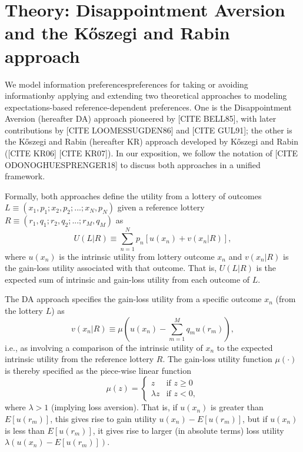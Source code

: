 \documentclass[12pt]{article}
\begin{document}
\section{Theory: Disappointment Aversion and the Kőszegi and Rabin approach}

We model information preferences\textemdash preferences for taking or avoiding information\textemdash by applying and extending two theoretical approaches to modeling expectations-based reference-dependent preferences. One is the Disappointment Aversion (hereafter DA) approach pioneered by [CITE BELL85], with later contributions by [CITE LOOMESSUGDEN86] and [CITE GUL91]; the other is the Kőszegi and Rabin (hereafter KR) approach developed by Kőszegi and Rabin ([CITE KR06] [CITE KR07]). In our exposition, we follow the notation of [CITE ODONOGHUESPRENGER18] to discuss both approaches in a unified framework.

Formally, both approaches define the utility from a lottery of outcomes $L \equiv (x_1,p_1;x_2,p_2;...;x_N,p_N)$ given a reference lottery $R \equiv (r_1,q_1;r_2,q_2;...;r_M,q_M)$ as
\begin{equation*}
  U(L|R) \equiv \sum_{n=1}^{N} p_n[u(x_n)+v(x_n|R)],
\end{equation*}
where $u(x_n)$ is the intrinsic utility from lottery outcome $x_n$ and $v(x_n|R)$ is the gain-loss utility associated with that outcome. That is, $U(L|R)$ is the expected sum of intrinsic and gain-loss utility from each outcome of $L$.

The DA approach specifies the gain-loss utility from a specific outcome $x_n$ (from the lottery $L$) as
\begin{equation*}
  v(x_n|R) \equiv \mu (u(x_n)-\sum_{m=1}^M q_mu(r_m)),
\end{equation*}
i.e., as involving a comparison of the intrinsic utility of $x_n$ to the expected intrinsic utility from the reference lottery $R$. The gain-loss utility function $\mu(\cdot)$ is thereby specified as the piece-wise linear function
\begin{equation*}
  \mu(z)=
  \begin{cases}
    z          & \text{if } z \geq 0 \\
    \lambda z  & \text{if } z < 0 ,
  \end{cases}
\end{equation*}
where $\lambda>1$ (implying loss aversion). That is, if $u(x_n)$ is greater than $E[u(r_m)]$, this gives rise to gain utility $u(x_n)-E[u(r_m)]$, but if $u(x_n)$ is less than $E[u(r_m)]$, it gives rise to larger (in absolute terms) loss utility $\lambda(u(x_n)-E[u(r_m)])$.
\end{document}
